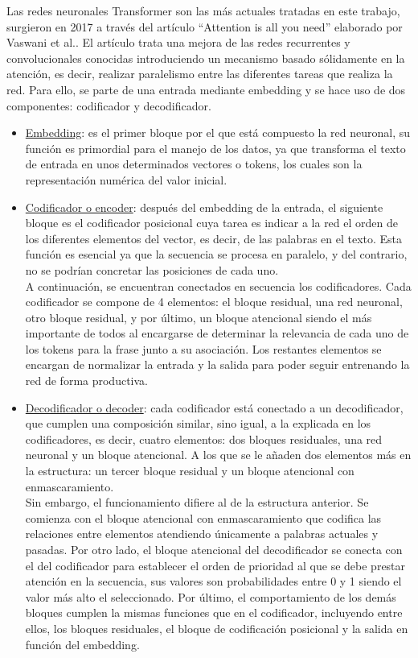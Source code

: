Las redes neuronales Transformer son las más actuales tratadas en este trabajo, surgieron en 2017 a través del artículo “Attention is all you need” elaborado por Vaswani et al.. El artículo trata una mejora de las redes recurrentes y convolucionales conocidas introduciendo un mecanismo basado sólidamente en la atención, es decir, realizar paralelismo entre las diferentes tareas que realiza la red. Para ello, se parte de una entrada mediante embedding y se hace uso de dos componentes: codificador y decodificador. \\
\begin{itemize}
	\item \underline{Embedding}: es el primer bloque por el que está compuesto la red neuronal, su función es primordial para el manejo de los datos, ya que transforma el texto de entrada en unos determinados vectores o tokens, los cuales son la representación numérica del valor inicial. \\
	\item \underline{Codificador o encoder}:  después del embedding de la entrada, el siguiente bloque es el codificador posicional cuya tarea es indicar a la red el orden de los diferentes elementos del vector, es decir, de las palabras en el texto. Esta función es esencial ya que la secuencia se procesa en paralelo, y del contrario, no se podrían concretar las posiciones de cada uno.\\
	
	A continuación, se encuentran conectados en secuencia los codificadores. Cada codificador se compone de 4 elementos: el bloque residual, una red neuronal, otro bloque residual, y por último, un bloque atencional siendo el más importante de todos al encargarse de determinar la relevancia de cada uno de los tokens para la frase junto a su asociación. Los restantes elementos se encargan de normalizar la entrada y la salida para poder seguir entrenando la red de forma productiva. \\
	\item 
	\underline{Decodificador o decoder}: cada codificador está conectado a un decodificador, que cumplen una composición similar, sino igual,  a  la explicada en los codificadores, es decir, cuatro elementos: dos bloques residuales, una red neuronal y un bloque atencional. A los que se le añaden dos elementos más en la estructura: un tercer bloque residual y un bloque atencional con enmascaramiento. \\
	
	Sin embargo, el funcionamiento difiere al de la estructura anterior. Se comienza con el bloque atencional con enmascaramiento que codifica las relaciones entre elementos atendiendo únicamente a palabras actuales y pasadas. Por otro lado, el bloque atencional del decodificador se conecta con el del codificador para establecer el orden de prioridad al que se debe prestar atención en la secuencia, sus valores son probabilidades entre 0 y 1 siendo el valor más alto el seleccionado. Por último, el comportamiento de los demás bloques cumplen la mismas funciones que en el codificador, incluyendo entre ellos, los bloques residuales, el bloque de codificación posicional y la salida en función del embedding.  \\
	

\end{itemize}
